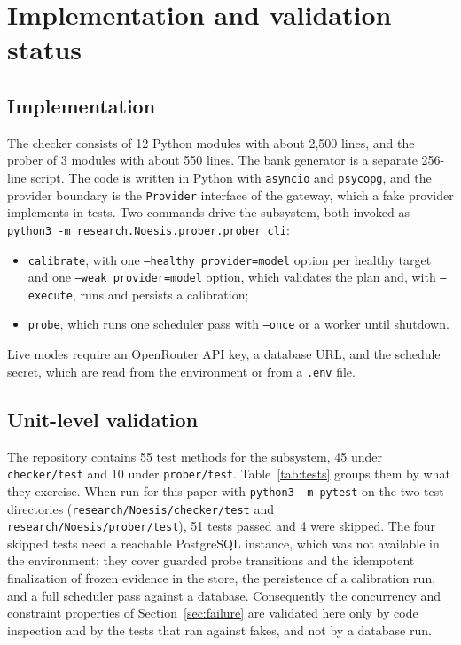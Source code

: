 \section{Implementation and validation status}
\label{sec:validation}

\subsection{Implementation}
\label{sec:implementation}

The checker consists of 12 Python modules with about 2,500 lines, and the
prober of 3 modules with about 550 lines. The bank generator is a separate
256-line script. The code is written in Python with \texttt{asyncio} and
\texttt{psycopg}, and the provider boundary is the \texttt{Provider} interface
of the gateway, which a fake provider implements in tests. Two commands drive
the subsystem, both invoked as \texttt{python3 -m research.Noesis.prober.\allowbreak prober\_\allowbreak cli}:
\begin{itemize}
  \item \texttt{calibrate}, with one \texttt{--healthy provider=model} option
    per healthy target and one \texttt{--weak provider=model} option, which
    validates the plan and, with \texttt{--execute}, runs and persists a
    calibration;
  \item \texttt{probe}, which runs one scheduler pass with \texttt{--once} or a
    worker until shutdown.
\end{itemize}
Live modes require an OpenRouter API key, a database URL, and the schedule
secret, which are read from the environment or from a \texttt{.env} file.

\subsection{Unit-level validation}
\label{sec:tests}

The repository contains 55 test methods for the subsystem, 45 under
\texttt{checker/test} and 10 under \texttt{prober/test}. Table~\ref{tab:tests}
groups them by what they exercise. When run for this paper with
\texttt{python3 -m pytest} on the two test directories
(\texttt{research/\allowbreak Noesis/\allowbreak checker/\allowbreak test} and
\texttt{research/\allowbreak Noesis/\allowbreak prober/\allowbreak test}),
51 tests passed and 4 were skipped. The four skipped tests need a reachable
PostgreSQL instance, which was not available in the environment; they cover
guarded probe transitions and the idempotent finalization of frozen evidence in
the store, the persistence of a calibration run, and a full scheduler pass
against a database. Consequently the concurrency and constraint
properties of Section~\ref{sec:failure} are validated here only by code
inspection and by the tests that ran against fakes, and not by a database run.

